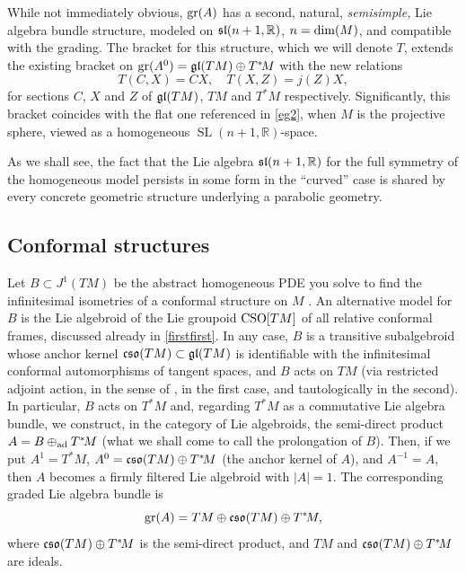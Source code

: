 \documentclass[leqno,12pt]{amsart} %
\begin{document}
While not immediately obvious, $\operatorname{\operatorname{gr}}(A)$ has a second, natural, {\em semisimple,} Lie
algebra bundle structure, modeled on $\mathfrak{sl}(n + 1, {\mathbb R})$,
$n= \operatorname{dim}(M)$, and compatible with the grading. The bracket for this structure, which
we will denote $T$, extends the existing bracket on $\operatorname{\operatorname{gr}}(A^0)=\mathfrak{gl}(TM) \oplus T^*\!M $
with the new relations
\begin{equation}
  T(C, X) = C X, \quad
    T(X, Z) = j(Z)X, \label{projective_bracket}
\end{equation}
for sections $C$, $X$ and $Z $ of $\mathfrak{gl}(TM)$, $TM$ and $T^*\!M $ respectively.
Significantly, this bracket coincides with the flat one referenced in \ref{eg2}, when $M$
is the projective sphere, viewed as a homogeneous
$\operatorname{SL}(n + 1, {\mathbb R})$-space.

As we shall see, the fact that the Lie algebra $\mathfrak{sl}(n + 1, {\mathbb R})$ for
the full symmetry of the homogeneous model persists in some form in the ``curved'' case is
shared by every concrete geometric structure underlying a parabolic geometry.

\subsection{Conformal structures}\label{conformal}
Let $B \subset J^1(TM)$ be the abstract homogeneous PDE you solve to find the
infinitesimal isometries of a conformal structure on $M$ \cite[Section 12]{Blaom_12}. An
alternative model for $B$ is the Lie algebroid of the Lie groupoid $\operatorname{\operatorname{CSO}}[TM]$ of all
relative conformal frames, discussed already in \ref{firstfirst}. In any case, $B$ is a
transitive subalgebroid whose anchor kernel $\mathfrak{cso}(TM)\subset \mathfrak{gl}(TM)$ is identifiable with
the infinitesimal conformal automorphisms of tangent spaces, and $B$ acts on $TM$ (via
restricted adjoint action, in the sense of \cite{Blaom_16b}, in the first case, and
tautologically in the second). In particular, $B$ acts on $T^*\!M $ and, regarding
$T^*\!M $ as a commutative Lie algebra bundle, we construct, in the category of Lie
algebroids, the semi-direct product $A = B \oplus_{\operatorname{ad}} T^*\!M $ (what we shall come
to call the {\df prolongation} of $B$). Then, if we put $A^1 = T^*\!M $,
$A^0 = \mathfrak{cso}(TM) \oplus T^*\!M$ (the anchor kernel of $A$), and $A^{-1}=A$, then $A$ becomes
a firmly filtered Lie algebroid with $|A| = 1$. The corresponding graded Lie algebra
bundle is
$$\operatorname{\operatorname{gr}}(A)=TM \oplus \mathfrak{cso}(TM) \oplus T^*\!M,$$ where $\mathfrak{cso}(TM) \oplus T^*\!M $ is the
semi-direct product, and $TM$ and $\mathfrak{cso}(TM) \oplus T^*\!M $ are ideals.
\end{document}

